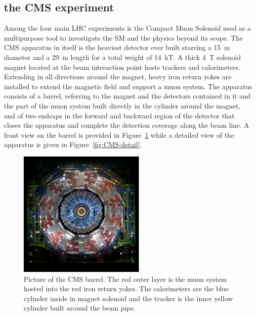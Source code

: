 	\subsection{the \acl{CMS} experiment}
	\label{chapt2:ssec:CMS}
	
	Among the four main LHC experiments is the Compact Muon Solenoid used as a multipurpose tool to investigate the SM and the physics beyond its scope. The CMS apparatus in itself is the heaviest detector ever built starring a \SI{15}{m} diameter and a \SI{29}{m} length for a total weight of \SI{14}{kT}. A thick \SI{4}{T} solenoid magnet located at the beam interaction point hosts trackers and calorimeters. Extending in all directions around the magnet, heavy iron return yokes are installed to extend the magnetic field and support a muon system. The apparatus consists of a barrel, referring to the magnet and the detectors contained in it and the part of the muon system built directly in the cylinder around the magnet, and of two endcaps in the forward and backward region of the detector that closes the apparatus and complete the detection coverage along the beam line. A front view on the barrel is provided in Figure~\ref{fig:CMS} while a detailed view of the apparatus is given in Figure~\ref{fig:CMS-detail}.
	
	\begin{figure}[H]
		\centering
		\includegraphics[width=0.55\textwidth]{fig/chapt2/CMS.jpg}
		\caption{\label{fig:CMS} Picture of the CMS barrel. The red outer layer is the muon system hosted into the red iron return yokes. The calorimeters are the blue cylinder inside in magnet solenoid and the tracker is the inner yellow cylinder built around the beam pipe.}
	\end{figure}
	
